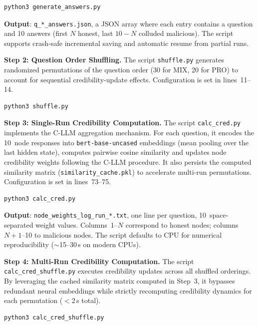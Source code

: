 \begin{lstlisting}[style=shell]
python3 generate_answers.py
\end{lstlisting}

\noindent\textbf{Output}: \texttt{q\_*\_answers.json}, a JSON array where each entry contains a question and 10 answers (first $N$ honest, last $10{-}N$ colluded malicious). The script supports crash-safe incremental saving and automatic resume from partial runs.

\smallskip\noindent\textbf{Step 2: Question Order Shuffling.} The script \texttt{shuffle.py} generates randomized permutations of the question order (30 for MIX, 20 for PRO) to account for sequential credibility-update effects. Configuration is set in lines~11--14.

\begin{lstlisting}[style=shell]
python3 shuffle.py
\end{lstlisting}

\smallskip\noindent\textbf{Step 3: Single-Run Credibility Computation.} The script \texttt{calc\_cred.py} implements the C-LLM aggregation mechanism. For each question, it encodes the 10~node responses into \texttt{bert\mbox{-}base\mbox{-}uncased} embeddings (mean pooling over the last hidden state), computes pairwise cosine similarity and updates node credibility weights following the C-LLM procedure. It also persists the computed similarity matrix (\texttt{similarity\_cache.pkl}) to accelerate multi-run permutations. Configuration is set in lines~73--75.

\begin{lstlisting}[style=shell]
python3 calc_cred.py
\end{lstlisting}

\noindent\textbf{Output}: \texttt{node\_weights\_log\_run\_*.txt}, one line per question, 10~space-separated weight values. Columns~1--$N$ correspond to honest nodes; columns~$N{+}1$--10 to malicious nodes. The script defaults to CPU for numerical reproducibility (${\sim}$15--30\,s on modern CPUs).

\smallskip\noindent\textbf{Step 4: Multi-Run Credibility Computation.} The script \texttt{calc\_cred\_shuffle.py} executes credibility updates across all shuffled orderings. By leveraging the cached similarity matrix computed in Step~3, it bypasses redundant neural embeddings while strictly recomputing credibility dynamics for each permutation ($<$2\,s total).

\begin{lstlisting}[style=shell]
python3 calc_cred_shuffle.py
\end{lstlisting}

